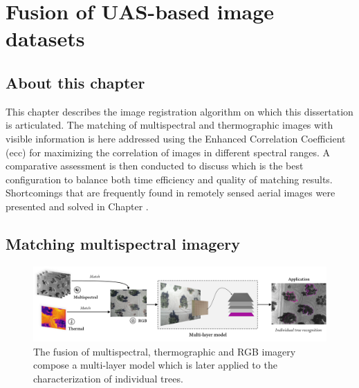 \setchapterpreamble[u]{\margintoc}
\chapter{Fusion of UAS-based image datasets}
\label{sec:image_fusion}

\section*{About this chapter}

This chapter describes the image registration algorithm on which this dissertation is articulated. The matching of multispectral and thermographic images with visible information is here addressed using the Enhanced Correlation Coefficient (\acrshort{ecc}) for maximizing the correlation of images in different spectral ranges. A comparative assessment is then conducted to discuss which is the best configuration to balance both time efficiency and quality of matching results. Shortcomings that are frequently found in remotely sensed aerial images were presented and solved in Chapter . 

\section{Matching multispectral imagery}

\begin{figure}
    \includegraphics[width=\linewidth]{figs/image_fusion/summary_image_fusion.png}\hspace*{\fill}
    \caption{The fusion of multispectral, thermographic and RGB imagery compose a multi-layer model which is later applied to the characterization of individual trees.}
	\label{fig:image_fusion_framework}
\end{figure}

